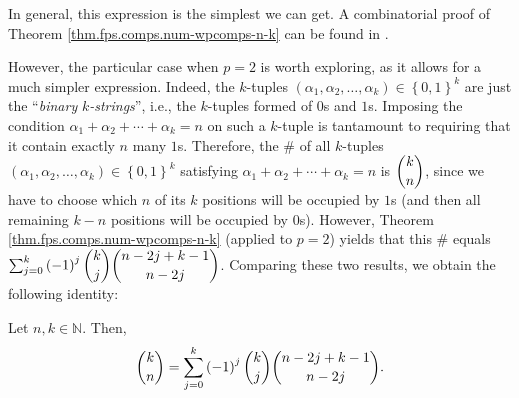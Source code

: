 In general, this expression is the simplest we can get. A combinatorial proof
of Theorem \ref{thm.fps.comps.num-wpcomps-n-k} can be found in \cite[Exercise
2.10.6]{19fco}.

However, the particular case when $p=2$ is worth exploring, as it allows for a
much simpler expression. Indeed, the $k$-tuples $\left(  \alpha_{1},\alpha
_{2},\ldots,\alpha_{k}\right)  \in\left\{  0,1\right\}  ^{k}$ are just the
\textquotedblleft\emph{binary }$k$\emph{-strings}\textquotedblright, i.e., the
$k$-tuples formed of $0$s and $1$s. Imposing the condition $\alpha_{1}%
+\alpha_{2}+\cdots+\alpha_{k}=n$ on such a $k$-tuple is tantamount to
requiring that it contain exactly $n$ many $1$s. Therefore, the \# of all
$k$-tuples $\left(  \alpha_{1},\alpha_{2},\ldots,\alpha_{k}\right)
\in\left\{  0,1\right\}  ^{k}$ satisfying $\alpha_{1}+\alpha_{2}+\cdots
+\alpha_{k}=n$ is $\dbinom{k}{n}$, since we have to choose which $n$ of its
$k$ positions will be occupied by $1$s (and then all remaining $k-n$ positions
will be occupied by $0$s). However, Theorem
\ref{thm.fps.comps.num-wpcomps-n-k} (applied to $p=2$) yields that this \#
equals $\sum_{j=0}^{k}\left(  -1\right)  ^{j}\dbinom{k}{j}\dbinom
{n-2j+k-1}{n-2j}$. Comparing these two results, we obtain the following identity:

\begin{proposition}
\label{prop.fps.comps.num-w2comps-n-k-id}Let $n,k\in\mathbb{N}$. Then,%
\[
\dbinom{k}{n}=\sum_{j=0}^{k}\left(  -1\right)  ^{j}\dbinom{k}{j}%
\dbinom{n-2j+k-1}{n-2j}.
\]

\end{proposition}
